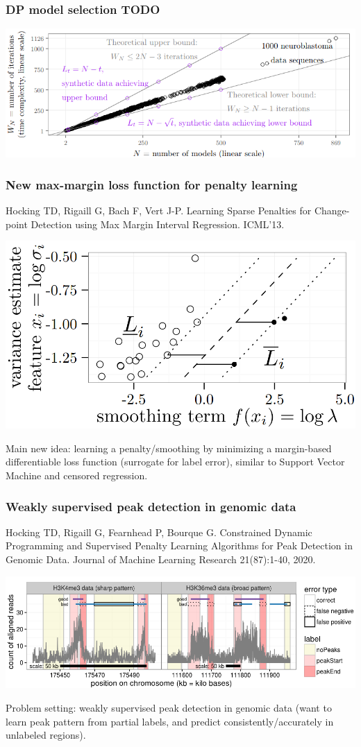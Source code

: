\documentclass[t]{beamer}
\begin{document}
\begin{frame}
  \frametitle{DP model selection TODO}
  \includegraphics[width=\textwidth]{figure-dp-model-selection-iterations}
\end{frame}

\begin{frame}
  \frametitle{New max-margin loss function for penalty learning}
  {\scriptsize Hocking TD, Rigaill G, Bach F, Vert J-P. Learning Sparse Penalties
  for Change-point Detection using Max Margin Interval
  Regression. ICML'13.}

  \includegraphics[width=\textwidth]{figure-ICML13-margin}

  Main new idea: learning a penalty/smoothing by minimizing a
  margin-based differentiable loss function (surrogate for label
  error), similar to Support Vector Machine and censored regression.
\end{frame}

\begin{frame}
  \frametitle{Weakly supervised peak detection in genomic data}
{\scriptsize Hocking TD, Rigaill G, Fearnhead P, Bourque G. Constrained Dynamic Programming and Supervised Penalty Learning Algorithms for Peak Detection in Genomic Data. Journal of Machine Learning Research 21(87):1-40, 2020.}

  \includegraphics[width=\textwidth]{figure-Hocking2020-peak-label-errors}

  Problem setting: weakly supervised peak detection in genomic data
  (want to learn peak pattern from partial labels, and predict
  consistently/accurately in unlabeled regions).
\end{frame}
\end{document}
